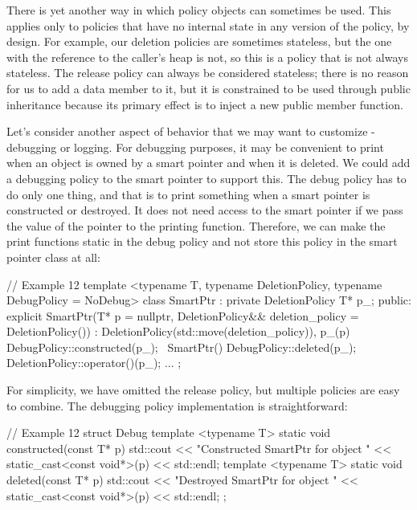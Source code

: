 There is yet another way in which policy objects can sometimes be used. This applies only to policies that have no internal state in any version of the policy, by design. For example, our deletion policies are sometimes stateless, but the one with the reference to the caller's heap is not, so this is a policy that is not always stateless. The release policy can always be considered stateless; there is no reason for us to add a data member to it, but it is constrained to be used through public inheritance because its primary effect is to inject a new public member function.

Let's consider another aspect of behavior that we may want to customize - debugging or logging. For debugging purposes, it may be convenient to print when an object is owned by a smart pointer and when it is deleted. We could add a debugging policy to the smart pointer to support this. The debug policy has to do only one thing, and that is to print something when a smart pointer is constructed or destroyed. It does not need access to the smart pointer if we pass the value of the pointer to the printing function. Therefore, we can make the print functions static in the debug policy and not store this policy in the smart pointer class at all:

\begin{code}
// Example 12
template <typename T,
          typename DeletionPolicy,
          typename DebugPolicy = NoDebug>
class SmartPtr : private DeletionPolicy {
  T* p_;
  public:
  explicit SmartPtr(T* p = nullptr,
    DeletionPolicy&& deletion_policy = DeletionPolicy())
  : DeletionPolicy(std::move(deletion_policy)), p_(p) {
    DebugPolicy::constructed(p_);
  }
  ~SmartPtr() {
    DebugPolicy::deleted(p_);
    DeletionPolicy::operator()(p_);
  }
  ...
};
\end{code}

For simplicity, we have omitted the release policy, but multiple policies are easy to combine. The debugging policy implementation is straightforward:

\begin{code}
// Example 12
struct Debug {
  template <typename T>
  static void constructed(const T* p) {
    std::cout << "Constructed SmartPtr for object " <<
      static_cast<const void*>(p) << std::endl;
  }
  template <typename T>
  static void deleted(const T* p) {
    std::cout << "Destroyed SmartPtr for object " <<
      static_cast<const void*>(p) << std::endl;
  }
};
\end{code}

